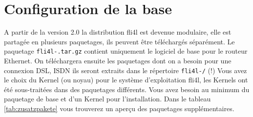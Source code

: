 
\chapter{Configuration de la base}

A partir de la version 2.0 la distribution fli4l est devenue modulaire, elle est
partagée en plusieurs paquetages, ils peuvent être téléchargés séparément.
Le paquetage \texttt{fli4l-\version.tar.gz} contient uniquement le logiciel de base
pour le routeur Ethernet. On téléchargera ensuite les paquetages dont on a besoin
pour une connexion DSL, ISDN ils seront extraits dans le répertoire \texttt{fli4l-\version/} (!)
Vous avez le choix du Kernel (ou noyau) pour le système d'exploitation fli4l, les Kernels
ont été sous-traitées dans des paquetages différents. Vous avez besoin au minimum
du paquetage de base et d'un Kernel pour l'installation. Dans le tableau \ref{tab:zusatzpakete}
vous trouverez un aperçu des paquetages supplémentaires.


